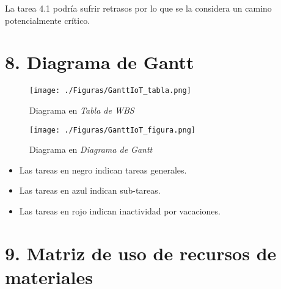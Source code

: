 \documentclass[11pt]{charter}
\begin{document}
La tarea 4.1 podría sufrir retrasos por lo que se la considera un camino potencialmente crítico. 

\vspace{20px}


\section{8. Diagrama de Gantt}
\label{sec:gantt}

\begin{figure}[htpb]
\centering 
\texttt{[image: ./Figuras/GanttIoT\_tabla.png]}
\caption{Diagrama en \textit{Tabla de WBS}}
\label{fig:AoN}
\end{figure}


\begin{figure}[htpb]
\centering 
\texttt{[image: ./Figuras/GanttIoT\_figura.png]}
\caption{Diagrama en \textit{Diagrama de Gantt}}
\label{fig:AoN}
\end{figure}



\begin{itemize}
	\item Las tareas en negro indican tareas generales. 
	\item Las tareas en azul indican sub-tareas.
	\item Las tareas en rojo indican inactividad por vacaciones.
\end{itemize}


\section{9. Matriz de uso de recursos de materiales}
\label{sec:recursos}
\end{document}
